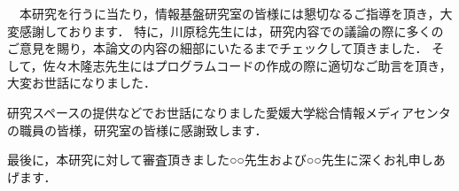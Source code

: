 \documentclass{thesis}
\begin{document}


\tableofcontents











\acknowledgement

　本研究を行うに当たり，情報基盤研究室の皆様には懇切なるご指導を頂き，大変感謝しております．
特に，川原稔先生には，研究内容での議論の際に多くのご意見を賜り，本論文の内容の細部にいたるまでチェックして頂きました．
そして，佐々木隆志先生にはプログラムコードの作成の際に適切なご助言を頂き，大変お世話になりました．

研究スペースの提供などでお世話になりました愛媛大学総合情報メディアセンタの職員の皆様，研究室の皆様に感謝致します．

最後に，本研究に対して審査頂きました○○先生および○○先生に深くお礼申しあげます．


\begin{comment}


\nocite{*}
\end{comment}
\end{document}
